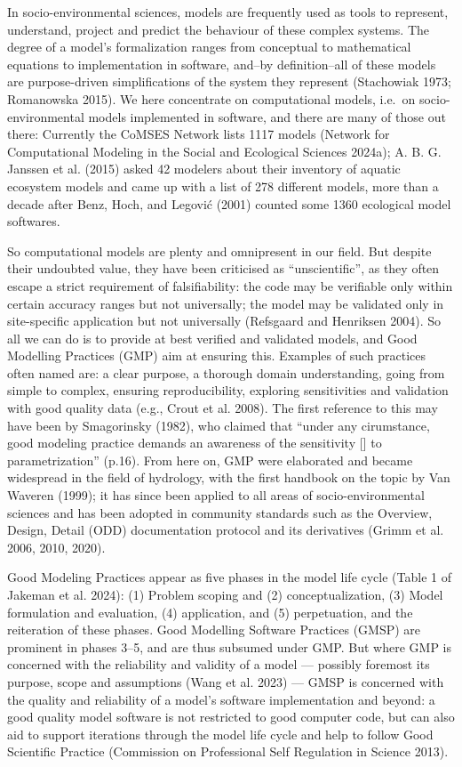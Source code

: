 \documentclass[preprint,11pt,5p]{elsarticle}
\begin{document}
In socio-environmental sciences, models are frequently used as tools to
represent, understand, project and predict the behaviour of these
complex systems. The degree of a model's formalization ranges from
conceptual to mathematical equations to implementation in software,
and--by definition--all of these models are purpose-driven
simplifications of the system they represent (Stachowiak 1973;
Romanowska 2015). We here concentrate on computational models, i.e.~on
socio-environmental models implemented in software, and there are many
of those out there: Currently the CoMSES Network lists 1117 models
(Network for Computational Modeling in the Social and Ecological
Sciences 2024a); A. B. G. Janssen et al. (2015) asked 42 modelers about
their inventory of aquatic ecosystem models and came up with a list of
278 different models, more than a decade after Benz, Hoch, and Legović
(2001) counted some 1360 ecological model softwares.

So computational models are plenty and omnipresent in our field. But
despite their undoubted value, they have been criticised as
``unscientific'', as they often escape a strict requirement of
falsifiability: the code may be verifiable only within certain accuracy
ranges but not universally; the model may be validated only in
site-specific application but not universally (Refsgaard and Henriksen
2004). So all we can do is to provide at best verified and validated
models, and Good Modelling Practices (GMP) aim at ensuring this.
Examples of such practices often named are: a clear purpose, a thorough
domain understanding, going from simple to complex, ensuring
reproducibility, exploring sensitivities and validation with good
quality data (e.g., Crout et al. 2008). The first reference to this may
have been by Smagorinsky (1982), who claimed that ``under any
cirumstance, good modeling practice demands an awareness of the
sensitivity {[}{]} to parametrization'' (p.16). From here on, GMP were
elaborated and became widespread in the field of hydrology, with the
first handbook on the topic by Van Waveren (1999); it has since been
applied to all areas of socio-environmental sciences and has been
adopted in community standards such as the Overview, Design, Detail
(ODD) documentation protocol and its derivatives (Grimm et al. 2006,
2010, 2020).

Good Modeling Practices appear as five phases in the model life cycle
(Table 1 of Jakeman et al. 2024): (1) Problem scoping and (2)
conceptualization, (3) Model formulation and evaluation, (4)
application, and (5) perpetuation, and the reiteration of these phases.
Good Modelling Software Practices (GMSP) are prominent in phases 3--5,
and are thus subsumed under GMP. But where GMP is concerned with the
reliability and validity of a model --- possibly foremost its purpose,
scope and assumptions (Wang et al. 2023) --- GMSP is concerned with the
quality and reliability of a model's software implementation and beyond:
a good quality model software is not restricted to good computer code,
but can also aid to support iterations through the model life cycle and
help to follow Good Scientific Practice (Commission on Professional Self
Regulation in Science 2013).
\end{document}
